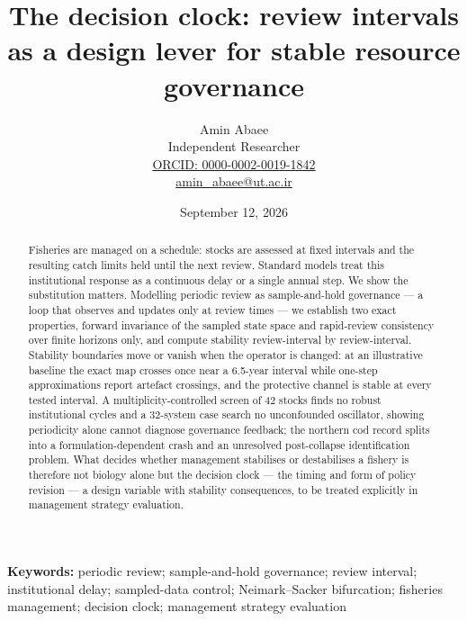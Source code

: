 \documentclass[11pt]{article}
\begin{document}
\linenumbers
\title{The decision clock: review intervals as a design lever for stable resource governance}
\author{Amin Abaee\\[0.35em]
{\small Independent Researcher}\\[0.55em]
{\small\href{https://orcid.org/0000-0002-0019-1842}{ORCID: 0000-0002-0019-1842}}\\[0.3em]
{\small\href{mailto:amin\_abaee@ut.ac.ir}{amin\_abaee@ut.ac.ir}}}
\date{September 12, 2026}
\maketitle

\begin{abstract}

Fisheries are managed on a schedule: stocks are assessed at fixed intervals and the resulting catch limits held until the next review. Standard models treat this institutional response as a continuous delay or a single annual step. We show the substitution matters. Modelling periodic review as sample-and-hold governance --- a loop that observes and updates only at review times --- we establish two exact properties, forward invariance of the sampled state space and rapid-review consistency over finite horizons only, and compute stability review-interval by review-interval. Stability boundaries move or vanish when the operator is changed: at an illustrative baseline the exact map crosses once near a 6.5-year interval while one-step approximations report artefact crossings, and the protective channel is stable at every tested interval. A multiplicity-controlled screen of 42 stocks finds no robust institutional cycles and a 32-system case search no unconfounded oscillator, showing periodicity alone cannot diagnose governance feedback; the northern cod record splits into a formulation-dependent crash and an unresolved post-collapse identification problem. What decides whether management stabilises or destabilises a fishery is therefore not biology alone but the decision clock --- the timing and form of policy revision --- a design variable with stability consequences, to be treated explicitly in management strategy evaluation.

\end{abstract}

\textbf{Keywords:} periodic review; sample-and-hold governance; review
interval; institutional delay; sampled-data control; Neimark--Sacker
bifurcation; fisheries management; decision clock; management strategy evaluation
\end{document}
